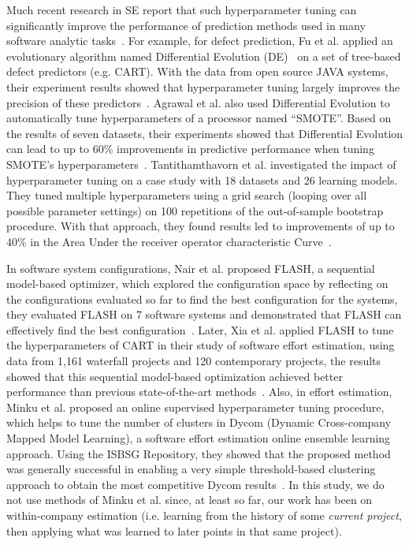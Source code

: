 \documentclass[smallextended]{svjour3}
\newcommand{\respto}[1]{
\fcolorbox{black}{black!15}{%
\label{resp:#1}%
\bf\scriptsize R{#1}}}
\newcommand{\BLUE}{\color{blue}}
\begin{document}
\BLUE
\respto{2F}
Much recent research in SE report that such hyperparameter tuning can significantly improve the performance of prediction methods used in many software  analytic tasks~\cite{fu2016differential,Fu2016TuningFS,agrawal2018betterdata,agrawal2019dodge,agrawal2018better,xia2020sequential}. For example, for defect prediction, 
Fu et al. applied an evolutionary algorithm named Differential Evolution (DE)~\cite{storn1997differential} on a set of tree-based defect predictors (e.g. CART). With the data from open source JAVA systems, their experiment results showed that hyperparameter tuning largely improves the precision of these predictors~\cite{Fu2016TuningFS}.
Agrawal et al. also used Differential Evolution to automatically tune hyperparameters of a processor named ``SMOTE''. Based on the results of seven datasets, their experiments showed that Differential Evolution can lead to up to 60\% improvements in predictive performance when tuning SMOTE’s hyperparameters~\cite{agrawal2018betterdata}.
Tantithamthavorn et al. investigated the impact of hyperparameter tuning on a case study with 18 datasets and 26 learning models. They tuned multiple hyperparameters using a grid search (looping over all possible parameter settings) on 100 repetitions of the out-of-sample bootstrap procedure. With that approach, they found results led to improvements of up to 40\% in the Area Under the receiver operator characteristic Curve~\cite{Tantithamthavorn16}.

In software system configurations, Nair et al. proposed FLASH, a sequential model-based optimizer, which explored the configuration space by reflecting on the configurations evaluated so far to find the best configuration for the systems, they evaluated FLASH on 7 software systems and demonstrated that FLASH can effectively find the best configuration~\cite{nair2017flash}. Later, Xia et al. applied FLASH to tune the hyperparameters of CART in their study of software effort estimation, using data from 1,161 waterfall projects and 120 contemporary projects, the results showed that this sequential model-based optimization achieved better performance than previous state-of-the-art methods~\cite{xia2020sequential}. Also, in effort estimation, Minku et al. proposed an online supervised hyperparameter tuning procedure, which helps to tune the number of clusters in Dycom (Dynamic Cross-company Mapped Model Learning), a software effort estimation online ensemble learning approach. Using the ISBSG Repository, they showed that the proposed method was generally successful in enabling a very simple threshold-based clustering approach to obtain the most competitive Dycom results~\cite{minku2019novel}.
In this study, we do not use methods of Minku et al. since,
at least so far, our work has been on within-company estimation (i.e. learning from the history of
some {\em current project}, then applying what was learned to later
points in that same project).
\end{document}
